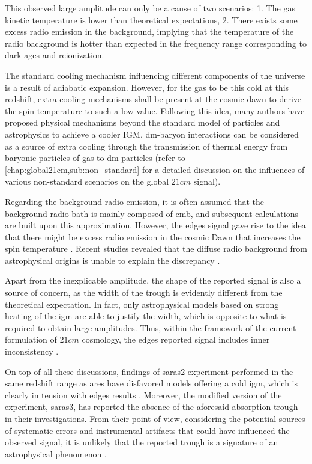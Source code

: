 \documentclass[12pt, TexShade, letterpaper]{report}
\begin{document}
 This observed large amplitude can only be a cause of two scenarios: 1. The gas kinetic temperature is lower than theoretical expectations, 2. There exists some excess radio emission in the background, implying that the temperature of the radio background is hotter than expected in the frequency range corresponding to dark ages and reionization. \par
 The standard cooling mechanism influencing different components of the universe is a result of adiabatic expansion. However, for the gas to be this cold at this redshift, extra cooling mechanisms shall be present at the cosmic dawn to derive the spin temperature to such a low value. Following this idea, many authors have proposed physical mechanisms beyond the standard model of particles and astrophysics to achieve a cooler IGM. \gls{dm}-baryon interactions can be considered as a source of extra cooling through the transmission of thermal energy from baryonic particles of gas to \gls{dm} particles \cite{dm_edges_1, dm_edges_2, dm_edges_3, dm_edges_4, dm_edges_5, dm_edges_6} (refer to \ref{chap:global21cm,sub:non_standard} for a detailed discussion on the influences of various non-standard scenarios on the global $21cm$ signal).\par
 Regarding the background radio emission, it is often assumed that the background radio bath is mainly composed of \gls{cmb}, and subsequent calculations are built upon this approximation. However, the \gls{edges} signal gave rise to the idea that there might be excess radio emission in the cosmic Dawn that increases the spin temperature \cite{excess_radio}. Recent studies revealed that the diffuse radio background from astrophysical origins is unable to explain the discrepancy \cite{excess_radio, thesis_shedding}.\par
 Apart from the inexplicable amplitude, the shape of the reported signal is also a source of concern, as the width of the trough is evidently different from the theoretical expectation. In fact, only astrophysical models based on strong heating of the \gls{igm} are able to justify the width, which is opposite to what is required to obtain large amplitudes. Thus, within the framework of the current formulation of $21cm$ cosmology, the \gls{edges} reported signal includes inner inconsistency \cite{edges_inconsistent_inner, thesis_shedding}.\par
 On top of all these discussions, findings of \gls{saras}2 experiment performed in the same redshift range as \gls{ares} have disfavored models offering a cold \gls{igm}, which is clearly in tension with \gls{edges} results \cite{saras_2_constrains, saras_2_results}. Moreover, the modified version of the experiment, \gls{saras}3, has reported the absence of the aforesaid absorption trough in their investigations. From their point of view, considering the potential sources of systematic errors and instrumental artifacts that could have influenced the observed signal, it is unlikely that the reported trough is a signature of an astrophysical phenomenon \cite{saras_3_results, saras_curse_edges}.\par
\end{document}
